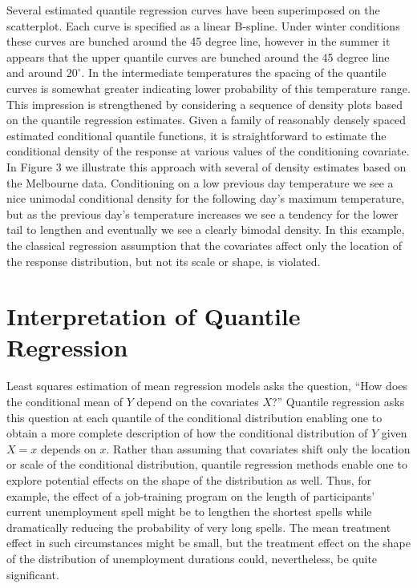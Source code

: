 \documentclass{amsart}
\begin{document}
 
Several estimated quantile regression curves have been superimposed
on the scatterplot.  Each curve is specified as a linear B-spline. 
Under winter conditions these curves are bunched around the 45 degree
line, however in the summer it appears that the upper quantile curves
are bunched around the 45 degree line and around $20^\circ$.  In the
intermediate temperatures the spacing of the quantile curves is somewhat
greater indicating lower probability of this temperature range.
This impression is strengthened by considering a sequence of density
plots based on the quantile regression estimates.
Given a family of reasonably densely spaced estimated conditional quantile 
functions, it is straightforward to estimate the conditional density of the 
response at various values of the conditioning covariate.  In Figure 3 we
illustrate this approach with several of density estimates based on the
Melbourne data.  
Conditioning on a low previous day temperature we see a nice unimodal
conditional density for the following day's maximum temperature, but
as the previous day's temperature increases we see a 
tendency for the lower tail to lengthen and eventually we see
a clearly bimodal density.  In this example, the classical regression
assumption that the covariates affect only the location of the
response distribution, but not its scale or shape, is violated.

\section{Interpretation of Quantile Regression}
Least squares estimation of mean regression models asks the question,
``How does the conditional mean of $Y$ depend on the covariates $X$?''
Quantile regression asks this question at each quantile
of the conditional distribution enabling one to obtain a more complete
description of how the conditional distribution of $Y$ given $X=x$ depends
on $x$.  Rather than assuming that covariates shift only the location
or scale of the conditional distribution, quantile regression methods
enable one to explore potential effects on the shape of the distribution
as well.  Thus, for example,  the effect of a job-training program on
the length of participants' current unemployment spell might be to
lengthen the shortest spells while dramatically reducing the probability
of very long spells.  The mean treatment effect in such circumstances
might be small, but the treatment effect on the shape of the distribution
of unemployment durations could, nevertheless, be quite significant. 
\end{document}
